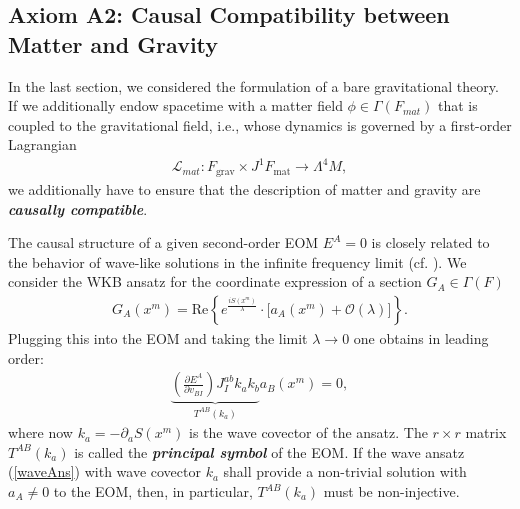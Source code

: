 \documentclass[%
preprint,
nofootinbib,
amsmath,amssymb,
aps,
prd,
floatfix,
]{revtex4-2}
\begin{document}
\subsection{Axiom A2: Causal Compatibility between Matter and Gravity}

In the last section, we considered the formulation of a bare gravitational theory. If we additionally endow spacetime with a matter field $\phi \in  \Gamma(F_{mat})$ that is coupled to the gravitational field, i.e., whose dynamics is governed by a first-order Lagrangian
\begin{align}\label{matterL}
    \mathcal{L}_{mat} : F_\text{grav} \times J^1F_\text{mat} \longrightarrow \Lambda^4M,
\end{align}
we additionally have to ensure that the description of matter and gravity are \textit{\textbf{causally compatible}}.

The causal structure of a given second-order EOM $E^A=0$ is closely related to the behavior of wave-like solutions in the infinite frequency limit (cf. \cite{2018PhRvD..97h4036D}). We consider the WKB ansatz for the coordinate expression of a section $G_A \in \Gamma(F)$
\begin{align}\label{waveAns}
    G_A(x^m) = \mathrm{Re}\left \{ e^{\frac{iS(x^m)}{\lambda}} \cdot   \bigl [ a_A(x^m) + \mathcal{O}(\lambda) \bigr ]\right \}.
\end{align}
Plugging this into the EOM and taking the limit $\lambda \rightarrow 0$ one obtains in leading order:
\begin{align}
    \underbrace{\left ( \frac{\partial E^A }{\partial v_{BI}} \right ) J_{I}^{ab} k_a k_b}_{T^{AB}(k_a)} a_B(x^m) = 0,
\end{align}
where now $k_a = - \partial_aS(x^m)$ is the wave covector of the ansatz. The $r\times r$ matrix $T^{AB}(k_a)$ is called the \textit{\textbf{principal symbol}} of the EOM. If the wave ansatz (\ref{waveAns}) with wave covector $k_a$ shall provide a non-trivial solution with $a_A \neq 0$ to the EOM, then, in particular,  $T^{AB}(k_a)$ must be non-injective. 
\end{document}
